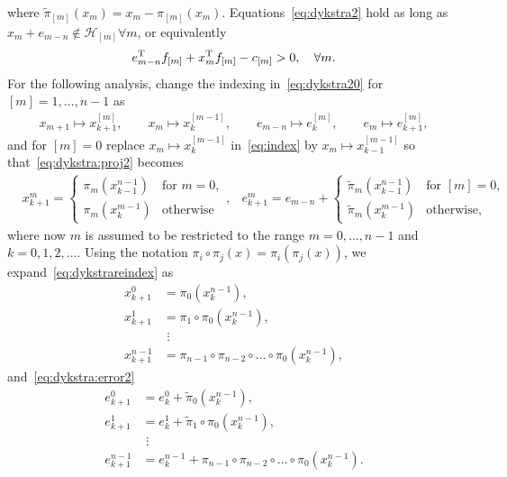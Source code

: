 \documentclass[hidelinks]{article}
\begin{document}
where $\tilde{\pi}_{[m]}(x_{m})=x_m-\pi_{[m]}(x_{m})$. Equations~\eqref{eq:dykstra2} hold as long as $x_m+e_{m-n}\not\in\mathcal{H}_{[m]}\forall m$, or equivalently
\begin{align}\label{eq:switch}
e_{m-n}^{\text{T}} f_{[m]}+x_m^{\text{T}} f_{[m]}-c_{[m]} > 0, \quad\forall m.
\end{align}
For the following analysis, change the indexing in~\eqref{eq:dykstra20} for $[m]=1,\dots,n-1$ as
\begin{align}\label{eq:index}
x_{m+1} \mapsto x_{k+1}^{[m]},\qquad x_{m} \mapsto x_{k}^{[m-1]},\qquad
e_{m-n} \mapsto e_{k}^{[m]},\qquad e_{m} \mapsto e_{k+1}^{[m]},
\end{align}
and for $[m]=0$ replace $x_{m} \mapsto x_{k}^{[m-1]}$ in~\eqref{eq:index} by $x_{m} \mapsto x_{k-1}^{[m-1]}$
so that~\eqref{eq:dykstra:proj2} becomes
\begin{align}\label{eq:dykstrareindex}
&x_{k+1}^{m}=
\begin{cases}
\pi_{m}(x_{k-1}^{n-1}) & \text{for } m=0,\\
\pi_{m}(x_{k}^{m-1}) & \text{otherwise}
\end{cases},
&e_{k+1}^{m}=e_{m-n}+
\begin{cases}
\tilde{\pi}_{m}(x_{k-1}^{n-1}) & \text{for } [m]=0,\\
\tilde{\pi}_{m}(x_{k}^{m-1}) & \text{otherwise},
\end{cases}
\end{align}
where now $m$ is assumed to be restricted to the range $m=0,\dots,n-1$ and $k=0,1,2,\dots$. Using the notation $\pi_i\circ\pi_j(x)=\pi_i(\pi_j(x))$, we expand~\eqref{eq:dykstrareindex} as
\begin{equation}
\begin{aligned}
x_{k+1}^0 &= \pi_0(x_k^{n-1}),\\
x_{k+1}^1 &= \pi_1\circ\pi_0(x_k^{n-1}),\\
&\,\,\vdots\\
x_{k+1}^{n-1} &= \pi_{n-1}\circ\pi_{n-2}\circ\dots\circ\pi_0(x_k^{n-1}),
\end{aligned}\label{eq:dykstra:proj3}
\end{equation}
and~\eqref{eq:dykstra:error2}
\begin{equation}
\begin{aligned}
e_{k+1}^0 &= e_k^0+\tilde{\pi}_0(x_k^{n-1}),\\
e_{k+1}^1 &= e_k^1+\tilde{\pi}_1\circ\pi_0(x_k^{n-1}),\\
&\,\,\vdots\\
e_{k+1}^{n-1} &= e_k^{n-1}+\pi_{n-1}\circ\pi_{n-2}\circ\dots\circ\pi_0(x_k^{n-1}).
\end{aligned}\label{eq:dykstra:error3}
\end{equation}
\end{document}
